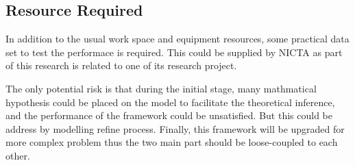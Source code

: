 \documentclass[a4paper,14pt]{article}
\begin{document}
\subsection{Resource Required}
In addition to the usual work space and equipment resources, some practical data set to test the performace is required. This could be supplied by NICTA as part of this research is related to one of its research project.

The only potential risk is that during the initial stage, many mathmatical hypothesis could be placed on the model to facilitate the theoretical inference, and the performance of the framework could be unsatisfied. But this could be address by modelling refine process. Finally, this framework will be upgraded for more complex problem thus the two main part should be loose-coupled to each other.   
%

\end{document}
